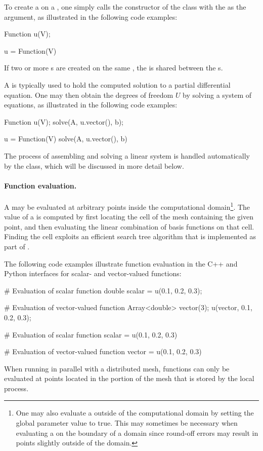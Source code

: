 To create a  on a , one simply calls
the constructor of the  class with the 
as the argument, as illustrated in the following code examples:
\begin{c++}
Function u(V);
\end{c++}
\begin{python}
u = Function(V)
\end{python}
If two or more s are created on the same
, the  is shared between the
s.

A  is typically used to hold the computed solution to a
partial differential equation. One may then obtain the degrees of
freedom $U$ by solving a system of equations, as illustrated in the
following code examples:
\begin{c++}
Function u(V);
solve(A, u.vector(), b);
\end{c++}
\begin{c++}
u = Function(V)
solve(A, u.vector(), b)
\end{c++}
The process of assembling and solving a linear system is handled
automatically by the class\break {}, which will be
discussed in more detail below.

\paragraph{Function evaluation.}

A  may be evaluated at arbitrary points inside the
computational domain\footnote{One may also evaluate a 
  outside of the computational domain by setting the global parameter value
   to true. This may sometimes be
  necessary when evaluating a  on the boundary of a
  domain since round-off errors may result in points slightly outside
  of the domain.}. The value of a  is computed by first
locating the cell of the mesh containing the given point, and then
evaluating the linear combination of basis functions on that cell. Finding
the cell exploits an efficient search tree
algorithm that is implemented as part of \citet{www:cgal}.

The following code examples illustrate function evaluation in the C++
and Python interfaces for scalar- and vector-valued functions:
\begin{c++}
# Evaluation of scalar function
double scalar = u(0.1, 0.2, 0.3);

# Evaluation of vector-valued function
Array<double> vector(3);
u(vector, 0.1, 0.2, 0.3);
\end{c++}
\begin{python}
# Evaluation of scalar function
scalar = u(0.1, 0.2, 0.3)

# Evaluation of vector-valued function
vector = u(0.1, 0.2, 0.3)
\end{python}
When running in parallel with a distributed mesh, functions can only be
evaluated at points located in the portion of the mesh that is stored
by the local process.

